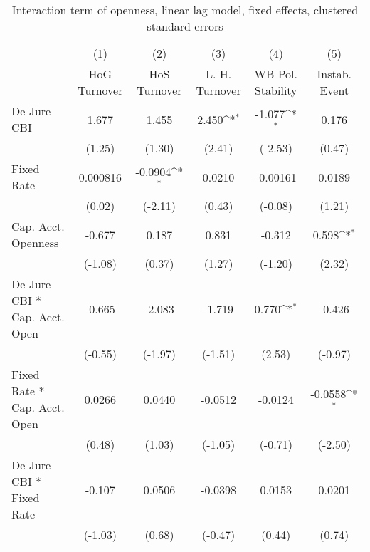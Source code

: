 {
\def\sym#1{\ifmmode^{#1}\else\(^{#1}\)\fi}
\begin{longtable}{l*{5}{c}}
\caption{Interaction term of openness, linear lag model, fixed effects, clustered standard errors \label{kapintlagsDJ}}\\
\hline\hline\endfirsthead\hline\endhead\hline\endfoot\endlastfoot
                &\multicolumn{1}{c}{(1)}&\multicolumn{1}{c}{(2)}&\multicolumn{1}{c}{(3)}&\multicolumn{1}{c}{(4)}&\multicolumn{1}{c}{(5)}\\
                &\multicolumn{1}{c}{HoG Turnover}&\multicolumn{1}{c}{HoS Turnover}&\multicolumn{1}{c}{L. H. Turnover}&\multicolumn{1}{c}{WB Pol. Stability}&\multicolumn{1}{c}{Instab. Event}\\
\hline
De Jure CBI     &    1.677         &    1.455         &    2.450\sym{*}  &   -1.077\sym{*}  &    0.176         \\
                &   (1.25)         &   (1.30)         &   (2.41)         &  (-2.53)         &   (0.47)         \\
[1em]
Fixed Rate      & 0.000816         &  -0.0904\sym{*}  &   0.0210         & -0.00161         &   0.0189         \\
                &   (0.02)         &  (-2.11)         &   (0.43)         &  (-0.08)         &   (1.21)         \\
[1em]
Cap. Acct. Openness&   -0.677         &    0.187         &    0.831         &   -0.312         &    0.598\sym{*}  \\
                &  (-1.08)         &   (0.37)         &   (1.27)         &  (-1.20)         &   (2.32)         \\
[1em]
De Jure CBI * Cap. Acct. Open&   -0.665         &   -2.083         &   -1.719         &    0.770\sym{*}  &   -0.426         \\
                &  (-0.55)         &  (-1.97)         &  (-1.51)         &   (2.53)         &  (-0.97)         \\
[1em]
Fixed Rate * Cap. Acct. Open&   0.0266         &   0.0440         &  -0.0512         &  -0.0124         &  -0.0558\sym{*}  \\
                &   (0.48)         &   (1.03)         &  (-1.05)         &  (-0.71)         &  (-2.50)         \\
[1em]
De Jure CBI * Fixed Rate&   -0.107         &   0.0506         &  -0.0398         &   0.0153         &   0.0201         \\
                &  (-1.03)         &   (0.68)         &  (-0.47)         &   (0.44)         &   (0.74)         \\

\end{longtable}}

